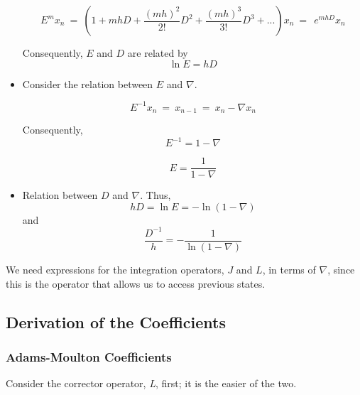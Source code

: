 \begin{itemize}
\begin{equation}
E^{m}x_{n}\ =\ \left(1+\mathit{mhD}+
\frac{(\mathit{mh})^{2}}{2!}D^{2}+
\frac{(\mathit{mh})^{3}}{3!}D^{3}+...\right)x_{n}\ =\ \ e^{\mathit{mhD}}x_{n}
\end{equation}

Consequently, $E$ and $D$ are related by 
\begin{equation}
\ln E=\mathit{hD}
\end{equation}

\item Consider the relation between $E$ and $\nabla$.

\begin{equation*}
E^{-1}x_{n}\ =\ x_{n-1}\ =\ x_{n}-\nabla x_{n}
\end{equation*}

Consequently,
\begin{equation*}
E^{-1} =1-\nabla 
\end{equation*}

\begin{equation} \label{eq:E_rel_del}
E = \frac{1}{1-\nabla}
\end{equation}

\item Relation between $D$ and $\nabla$.
Thus,
\begin{equation}
\mathit{hD}=\ln E=-\ln (1-\nabla )
\end{equation}
and
\begin{equation}\label{eq:D_inv_rel_del}
\frac{D^{-1}}{h}=-\frac{1}{\ln (1-\nabla )}
\end{equation}
\end{itemize}

We need expressions for the integration operators, $J$ and $L$, in
terms of $\nabla $, since this is the operator that allows us to
access previous states.

\subsection{Derivation of the Coefficients}\label{sec:math_form_gj_coeffs}

\subsubsection{Adams-Moulton Coefficients}
\label{sec:math_form_gj_adams_moulton}

Consider the corrector operator, \textit{L},  first; it is the easier of the 
two.

